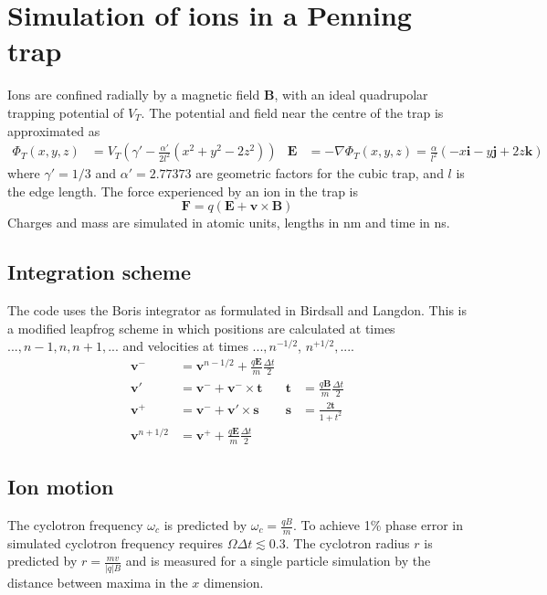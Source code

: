 \documentclass[10pt,conference,onecolumn]{IEEEtran}
\begin{document}
\section{Simulation of ions in a Penning trap}

Ions are confined radially by a magnetic field $\mathbf{B}$, with an ideal quadrupolar trapping potential of $V_T$.
The potential and field near the centre of the trap is approximated as 
\begin{align}
\Phi_T(x,y,z) &= V_T (\gamma' - \frac{\alpha'}{2l^2}(x^2 + y^2 - 2z^2)) &
\mathbf{E} &= - \nabla \Phi_T(x,y,z) = \frac{\alpha}{l^2}(-x\mathbf{i} -y\mathbf{j} +2z\mathbf{k})
\end{align}
where $\gamma' = 1/3$ and $\alpha' = 2.77373$ are geometric factors for the cubic trap, and $l$ is the edge length\cite{Guan1995}.
The force experienced by an ion in the trap is
\begin{equation}
\mathbf{F} = q(\mathbf{E} + \mathbf{v} \times \mathbf{B})
\end{equation}
Charges and mass are simulated in atomic units, lengths in nm and time in ns.



\subsection{Integration scheme}
The code uses the Boris integrator\cite{Boris1970} as formulated in Birdsall and Langdon\cite{Birdsall1985}.
This is a modified leapfrog scheme in which positions are calculated at times $..., n-1, n, n+1, ...$ and velocities at times $..., n^{-1/2}$, $n^{+1/2}, ...$.
\begin{align}
\mathbf{v}^- &= \mathbf{v}^{n-1/2} + \frac{q \mathbf{E}}{m} \frac{\Delta t}{2} \\
\mathbf{v}'  &= \mathbf{v}^- + \mathbf{v}^- \times \mathbf{t} & \mathbf{t}   &= \frac{q\mathbf{B}}{m} \frac{\Delta t}{2} \\
\mathbf{v}^+ &= \mathbf{v}^- + \mathbf{v}' \times \mathbf{s} & \mathbf{s}   &= \frac{2\mathbf{t}}{1 + t^2} \\
\mathbf{v}^{n+1/2} &= \mathbf{v}^+ + \frac{q \mathbf{E}}{m} \frac{\Delta t}{2}
\end{align}


\subsection{Ion motion}

The cyclotron frequency $\omega_c$ is predicted by $\omega_c = \frac{q B}{m}$\cite{Guan1995}.  
To achieve 1\% phase error in simulated cyclotron frequency requires $\Omega \Delta t \lesssim 0.3$\cite{Birdsall1985,Patacchini2009}.
The cyclotron radius $r$ is predicted by $r = \frac{m v}{|q| B}$ and is measured for a single particle simulation by the distance between maxima in the $x$ dimension.
\end{document}
